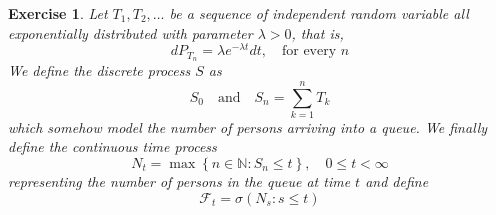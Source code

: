 \documentclass[DIV=classic,a4paper,10pt]{scrartcl}
\newtheorem{exercise}[theorem]{Exercise}
\theoremstyle{nonumberplain}
\numberwithin{equation}{section}
\begin{document}
\begin{exercise}
    Let $T_1,T_2,\ldots$ be a sequence of independent random variable all exponentially distributed with parameter $\lambda>0$, that is,
    \begin{equation*}
        dP_{T_n}=\lambda e^{-\lambda t} dt, \quad \text{for every }n
    \end{equation*}
    We define the discrete process $S$ as
    \begin{equation*}
        S_0 \quad\text{and}\quad S_n=\sum_{k=1}^n T_k
    \end{equation*}
    which somehow model the number of persons arriving into a queue.
    We finally define the continuous time process
    \begin{equation*}
        N_t=\max\left\{ n\in \mathbb{N}\colon S_n\leq t \right\}, \quad 0\leq t <\infty
    \end{equation*}
    representing the number of persons in the queue at time $t$ and define
    \begin{equation*}
        \mathcal{F}_t=\sigma\left( N_s\colon s\leq t \right)
    \end{equation*}


\end{exercise}
\end{document}
